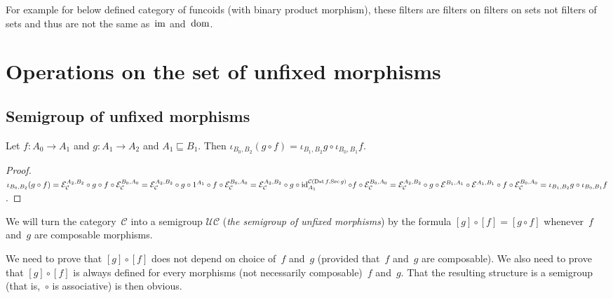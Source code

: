 \begin{note}
For example for below defined category of funcoids
(with binary product morphism), these filters are filters
on filters on sets not filters of sets and thus are not
the same as~$\operatorname{im}$ and~$\operatorname{dom}$.
\end{note}

\section{Operations on the set of unfixed morphisms}

\subsection{Semigroup of unfixed morphisms}

\begin{prop}\label{iota-comp}
  Let $f : A_0 \rightarrow A_1$ and $g : A_1 \rightarrow A_2$ and $A_1
  \sqsubseteq B_1$. Then $\iota_{B_0, B_2} (g \circ f) = \iota_{B_1, B_2} g
  \circ \iota_{B_0, B_1} f$.
\end{prop}

\begin{proof}
  $\iota_{B_0, B_2} (g \circ f) = \mathcal{E}_{\mathcal{C}}^{A_2,B_2}
  \circ g \circ f \circ \mathcal{E}_{\mathcal{C}}^{B_0,A_0} = \mathcal{E}_{\mathcal{C}}^{A_2,B_2} \circ g \circ 1^{A_1} \circ f
  \circ \mathcal{E}_{\mathcal{C}}^{B_0,A_0} = \mathcal{E}_{\mathcal{C}}^{A_2,B_2} \circ g \circ \operatorname{id}^{\mathcal{C}(\operatorname{Dst} f,\operatorname{Src} g)}_{A_1} \circ f
  \circ \mathcal{E}_{\mathcal{C}}^{B_0,A_0} = \mathcal{E}_{\mathcal{C}}^{A_2,B_2} \circ g \circ \mathcal{E}^{B_1,A_1}
  \circ \mathcal{E}^{A_1,B_1} \circ f \circ \mathcal{E}_{\mathcal{C}}^{B_0,A_0} = \iota_{B_1, B_2} g \circ \iota_{B_0,
  B_1} f$.
\end{proof}

\begin{defn}
We will turn the category~$\mathcal{C}$ into a semigroup
$\mathcal{U}\mathcal{C}$
(\emph{the semigroup of unfixed morphisms}) by
the formula $[g]\circ[f] = [g\circ f]$ whenever~$f$ and~$g$
are composable morphisms.
\end{defn}

We need to prove that $[g]\circ[f]$ does not depend on
choice of~$f$ and~$g$ (provided that~$f$ and~$g$
are composable). We also need to prove that $[g]\circ[f]$
is always defined for every morphisms (not necessarily
composable)~$f$ and~$g$. That the resulting structure is
a semigroup (that is,~$\circ$ is associative) is then
obvious.


